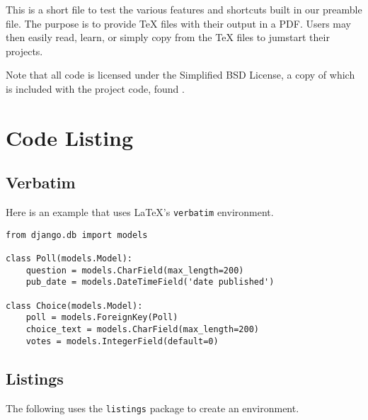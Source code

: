 






This is a short file to test the various features and shortcuts built in our preamble file. The purpose is to provide \TeX{} files with their output in a PDF. Users may then easily read, learn, or simply copy from the \TeX{} files to jumstart their projects.

Note that all code is licensed under the Simplified BSD License, a copy of which is included with the project code, found .

\section{Code Listing}

\subsection{Verbatim}

Here is an example that uses \LaTeX 's \verb|verbatim| environment.

\begin{verbatim}
from django.db import models

class Poll(models.Model):
    question = models.CharField(max_length=200)
    pub_date = models.DateTimeField('date published')

class Choice(models.Model):
    poll = models.ForeignKey(Poll)
    choice_text = models.CharField(max_length=200)
    votes = models.IntegerField(default=0)
\end{verbatim}
\subsection{Listings}

The following uses the \verb|listings| package to create an environment.

